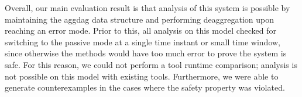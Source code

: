 Overall, our main evaluation result is that analysis of this system is possible by maintaining the aggdag data structure and
performing deaggregation upon reaching an error mode.
%
Prior to this, all analysis on this model checked for switching to the passive mode at a single time instant or small time window, since otherwise the methods would have too much error to prove the system is safe.
%
For this reason, we could not perform a tool runtime comparison; analysis is not possible on this model with existing tools.
%
Furthermore, we were able to generate counterexamples in the cases where the safety property was violated.
